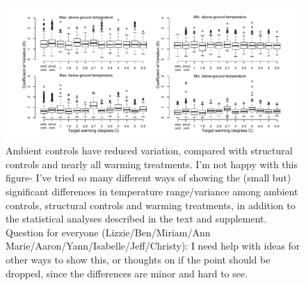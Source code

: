 \documentclass{article}
\begin{document}
\begin{figure}[p]
\centering
\includegraphics{../Analyses/figures/DRAFT_CVBytreatment.pdf} 
\caption{Ambient controls have reduced variation, compared with structural controls and nearly all warming treatments. I'm not happy with this figure- I've tried so many different ways of showing the (small but) significant differences in temperature range/variance among ambient controls, structural controls and warming treatments, in addition to the statistical analyses described in the text and supplement. Question for everyone (Lizzie/Ben/Miriam/Ann Marie/Aaron/Yann/Isabelle/Jeff/Christy): I need help with ideas for other ways to show this, or thoughts on if the point should be dropped, since the differences are minor and hard to see.} %

 \label{fig:cv}
 \end{figure}
\end{document}
